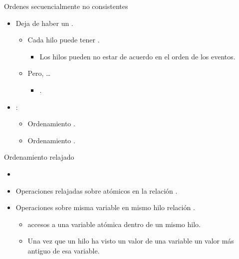 \begin{frame}[t,fragile]{Ordenes secuencialmente no consistentes}
\begin{itemize}
\item Deja de haber un .
  \begin{itemize}
    \item Cada hilo puede tener .
      \begin{itemize}
        \item Los hilos pueden no estar de acuerdo en el orden de los eventos.
      \end{itemize}

    \pause
    \item Pero, \ldots
      \begin{itemize}
        \item {}.
      \end{itemize}
  \end{itemize}
\item {}:
  \begin{itemize}
    \item Ordenamiento .
    \item Ordenamiento .
  \end{itemize}
\end{itemize}
\end{frame}

\begin{frame}[t]{Ordenamiento relajado}
\begin{itemize}
\item {}
  \item Operaciones relajadas sobre atómicos  en la relación .

  \item Operaciones sobre misma variable en mismo hilo  relación .
    \begin{itemize}
      \item {} accesos a una variable atómica dentro de un mismo hilo.
      \item Una vez que un hilo ha visto un valor de una variable  un valor más antiguo de esa variable.
    \end{itemize}
\end{itemize}
\end{frame}

